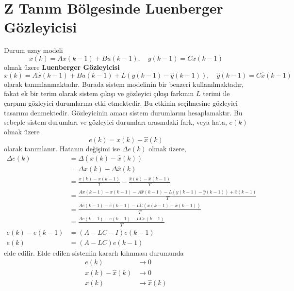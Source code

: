 \chapter{Z Tanım Bölgesinde Luenberger Gözleyicisi}
Durum uzay modeli
\begin{equation}
    x(k)=A x(k-1)+Bu(k-1),\quad y(k-1)=C x(k-1)
\end{equation}
olmak üzere \textbf{Luenberger Gözleyicisi}
\begin{equation}
    \hat{x}(k)=A \hat{x}(k-1)+Bu(k-1)+L(y(k-1)-\hat{y}(k-1)),\quad \hat{y}(k-1)=C \hat{x}(k-1)
\end{equation}
olarak tanımlanmaktadır. Burada sistem modelinin bir benzeri kullanılmaktadır, fakat ek bir terim olarak sistem çıkışı ve gözleyici çıkışı farkının $L$ terimi ile çarpımı gözleyici durumlarına etki etmektedir. Bu etkinin seçilmesine gözleyici tasarımı denmektedir. Gözleyicinin amacı sistem durumlarını hesaplamaktır. Bu sebeple sistem durumları ve gözleyici durumları arasındaki fark, veya hata, $e(k)$ olmak üzere
\begin{equation}
    e(k)=x(k)-\hat{x}(k)
\end{equation}
olarak tanımlanır. Hatanın değişimi ise $\Delta e(k)$ olmak üzere,
\begin{equation}
\begin{split}
    \Delta e(k)&=\Delta (x(k)-\hat{x}(k))\\
    &=\Delta x(k)-\Delta\hat{x}(k)\\
    &=\frac{x(k)-x(k-1)}{T}-\frac{\hat{x}(k)-\hat{x}(k-1)}{T}\\
    &=\frac{A x(k-1)-x(k-1)-A\hat{x}(k-1)-L(y(k-1)-\hat{y}(k-1))+\hat{x}(k-1)}{T}\\
    &=\frac{A e(k-1)-e(k-1)-LC(x(k-1)-\hat{x}(k-1))}{T}\\
    &=\frac{A e(k-1)-e(k-1)-LCe(k-1)}{T}\\
    e(k)-e(k-1)&=(A-LC-I)e(k-1)\\
    e(k)&=(A-LC)e(k-1)
\end{split}
\end{equation}
elde edilir. Elde edilen sistemin kararlı kılınması durumunda 
\begin{equation}
\begin{split}
    e(k)&\rightarrow 0\\
    x(k)-\hat{x}(k)&\rightarrow 0\\
    x(k)&\rightarrow \hat{x}(k)
\end{split}
\end{equation}
